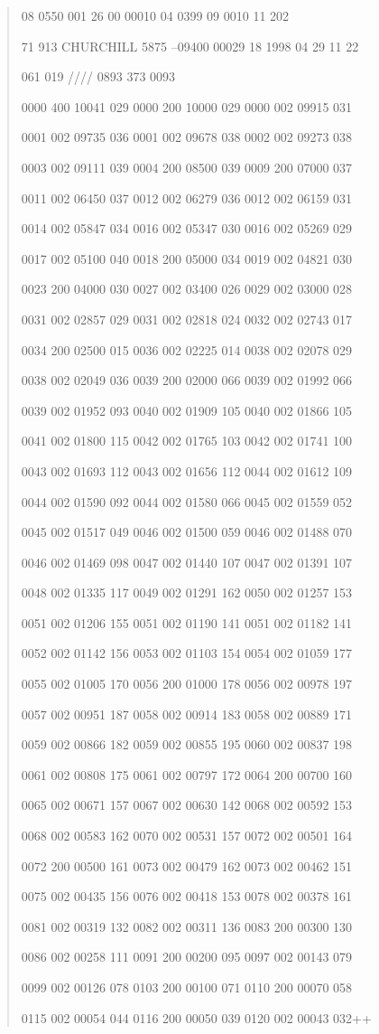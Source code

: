\begin{quote}
08 0550 001 26 00 00010 04 0399 09 0010 11 202

71 913 CHURCHILL 5875 --09400 00029 18 1998 04 29 11 22

061 019 //// 0893 373 0093

0000 400 10041 029 0000 200 10000 029 0000 002 09915 031

0001 002 09735 036 0001 002 09678 038 0002 002 09273 038

0003 002 09111 039 0004 200 08500 039 0009 200 07000 037

0011 002 06450 037 0012 002 06279 036 0012 002 06159 031

0014 002 05847 034 0016 002 05347 030 0016 002 05269 029

0017 002 05100 040 0018 200 05000 034 0019 002 04821 030

0023 200 04000 030 0027 002 03400 026 0029 002 03000 028

0031 002 02857 029 0031 002 02818 024 0032 002 02743 017

0034 200 02500 015 0036 002 02225 014 0038 002 02078 029

0038 002 02049 036 0039 200 02000 066 0039 002 01992 066

0039 002 01952 093 0040 002 01909 105 0040 002 01866 105

0041 002 01800 115 0042 002 01765 103 0042 002 01741 100

0043 002 01693 112 0043 002 01656 112 0044 002 01612 109

0044 002 01590 092 0044 002 01580 066 0045 002 01559 052

0045 002 01517 049 0046 002 01500 059 0046 002 01488 070

0046 002 01469 098 0047 002 01440 107 0047 002 01391 107

0048 002 01335 117 0049 002 01291 162 0050 002 01257 153

0051 002 01206 155 0051 002 01190 141 0051 002 01182 141

0052 002 01142 156 0053 002 01103 154 0054 002 01059 177

0055 002 01005 170 0056 200 01000 178 0056 002 00978 197

0057 002 00951 187 0058 002 00914 183 0058 002 00889 171

0059 002 00866 182 0059 002 00855 195 0060 002 00837 198

0061 002 00808 175 0061 002 00797 172 0064 200 00700 160

0065 002 00671 157 0067 002 00630 142 0068 002 00592 153

0068 002 00583 162 0070 002 00531 157 0072 002 00501 164

0072 200 00500 161 0073 002 00479 162 0073 002 00462 151

0075 002 00435 156 0076 002 00418 153 0078 002 00378 161

0081 002 00319 132 0082 002 00311 136 0083 200 00300 130

0086 002 00258 111 0091 200 00200 095 0097 002 00143 079

0099 002 00126 078 0103 200 00100 071 0110 200 00070 058

0115 002 00054 044 0116 200 00050 039 0120 002 00043 032++
\end{quote}

